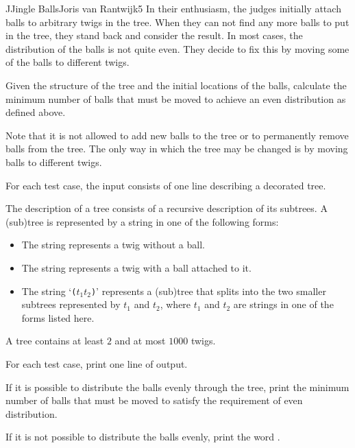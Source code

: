 \begin{icpcproblem}{J}{Jingle Balls}{Joris van Rantwijk}{5}
In their enthusiasm, the judges initially attach balls to arbitrary twigs in the tree.
When they can not find any more balls to put in the tree, they stand back and consider the result.
In most cases, the distribution of the balls is not quite even.
They decide to fix this by moving some of the balls to different twigs.


Given the structure of the tree and the initial locations of the balls, calculate the minimum number of balls that must be moved to achieve an even distribution as defined above.

Note that it is not allowed to add new balls to the tree or to permanently remove balls from the tree.
The only way in which the tree may be changed is by moving balls to different twigs.

\newpage
{}

For each test case, the input consists of one line describing a decorated tree.

The description of a tree consists of a recursive description of its subtrees.
A (sub)tree is represented by a string in one of the following forms:
\begin{itemize}
  \item The string \typeword{()} represents a twig without a ball.
  \item The string  represents a twig with a ball attached to it.
  \item The string `\texttt{(}$t_1$$t_2$\texttt{)}' represents a (sub)tree that splits into the two smaller subtrees represented by $t_1$ and $t_2$, where $t_1$ and $t_2$ are strings in one of the forms listed here.
\end{itemize}

A tree contains at least $2$ and at most $1000$ twigs.


For each test case, print one line of output.

If it is possible to distribute the balls evenly through the tree, print the minimum number of balls that must be moved to satisfy the requirement of even distribution.

If it is not possible to distribute the balls evenly, print the word .


\vspace{0.5cm}

\begin{figure}[h]
\begin{tabular}{ccc}


\end{tabular}
\end{figure}
\end{icpcproblem}
